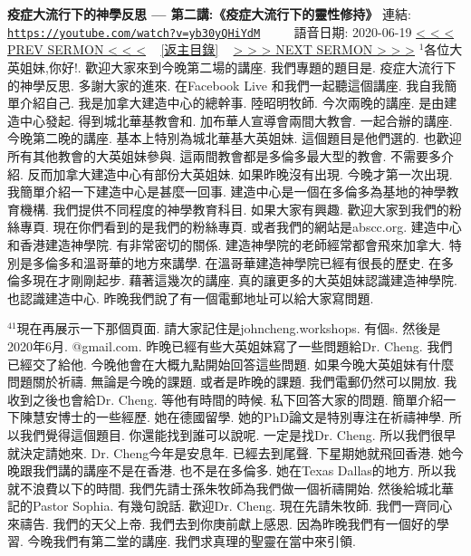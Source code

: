 \documentclass{book}
\begin{document}
\section{}
\label{sec:yb30yQHiYdM}
\textbf{疫症大流行下的神學反思 --- 第二講:《疫症大流行下的靈性修持》}
\newline
\newline
連結: \href{https://youtube.com/watch?v=yb30yQHiYdM}{\texttt{https://youtube.com/watch?v=yb30yQHiYdM}} ~~~~ 語音日期: 2020-06-19
\newline
\newline
\hyperref[sec:fFkCm0QGBPw]{\small{< < < PREV SERMON < < <}}
~
\hyperref[sec:index]{\small{[返主目錄]}}
~
\hyperref[sec:P0Y2lvzICsM]{\small{> > > NEXT SERMON > > >}}
\newline
\newline
$^{1}$各位大英姐妹,你好!.
歡迎大家來到今晚第二場的講座.
我們專題的題目是.
疫症大流行下的神學反思.
多謝大家的進來.
在Facebook Live 和我們一起聽這個講座.
我自我簡單介紹自己.
我是加拿大建造中心的總幹事.
陸昭明牧師.
今次兩晚的講座.
是由建造中心發起.
得到城北華基教會和.
加布華人宣導會兩間大教會.
一起合辦的講座.
今晚第二晚的講座.
基本上特別為城北華基大英姐妹.
這個題目是他們選的.
也歡迎所有其他教會的大英姐妹參與.
這兩間教會都是多倫多最大型的教會.
不需要多介紹.
反而加拿大建造中心有部份大英姐妹.
如果昨晚沒有出現.
今晚才第一次出現.
我簡單介紹一下建造中心是甚麼一回事.
建造中心是一個在多倫多為基地的神學教育機構.
我們提供不同程度的神學教育科目.
如果大家有興趣.
歡迎大家到我們的粉絲專頁.
現在你們看到的是我們的粉絲專頁.
或者我們的網站是abscc.org.
建造中心和香港建造神學院.
有非常密切的關係.
建造神學院的老師經常都會飛來加拿大.
特別是多倫多和溫哥華的地方來講學.
在溫哥華建造神學院已經有很長的歷史.
在多倫多現在才剛剛起步.
藉著這幾次的講座.
真的讓更多的大英姐妹認識建造神學院.
也認識建造中心.
昨晚我們說了有一個電郵地址可以給大家寫問題.

$^{41}$現在再展示一下那個頁面.
請大家記住是johncheng.workshops.
有個s.
然後是2020年6月.
@gmail.com.
昨晚已經有些大英姐妹寫了一些問題給Dr. Cheng.
我們已經交了給他.
今晚他會在大概九點開始回答這些問題.
如果今晚大英姐妹有什麼問題關於祈禱.
無論是今晚的課題.
或者是昨晚的課題.
我們電郵仍然可以開放.
我收到之後也會給Dr. Cheng.
等他有時間的時候.
私下回答大家的問題.
簡單介紹一下陳慧安博士的一些經歷.
她在德國留學.
她的PhD論文是特別專注在祈禱神學.
所以我們覺得這個題目.
你還能找到誰可以說呢.
一定是找Dr. Cheng.
所以我們很早就決定請她來.
Dr. Cheng今年是安息年.
已經去到尾聲.
下星期她就飛回香港.
她今晚跟我們講的講座不是在香港.
也不是在多倫多.
她在Texas Dallas的地方.
所以我就不浪費以下的時間.
我們先請士孫朱牧師為我們做一個祈禱開始.
然後給城北華記的Pastor Sophia.
有幾句說話.
歡迎Dr. Cheng.
現在先請朱牧師.
我們一齊同心來禱告.
我們的天父上帝.
我們去到你庚前獻上感恩.
因為昨晚我們有一個好的學習.
今晚我們有第二堂的講座.
我們求真理的聖靈在當中來引領.
\end{document}
